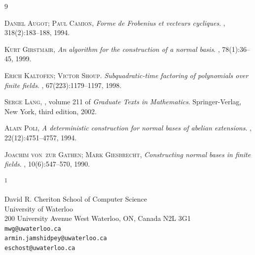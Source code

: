 \documentclass{article}
\newcommand{\ADDRESS}[2]{\noindent
  \textsuperscript{#1}\parbox[t]{0.9\textwidth}{#2} \vspace{6pt}}
\begin{document}



\begin{thebibliography}{9}

\textsc{Daniel Augot; Paul Camion},
\newblock \emph{Forme de {F}robenius et vecteurs cycliques}.
, 318(2):183--188, 1994.

\textsc{Kurt Girstmair},
\newblock \emph{An algorithm for the construction of a normal basis}.
, 78(1):36--45, 1999.

\textsc{Erich Kaltofen; Victor Shoup}.
\newblock \emph{Subquadratic-time factoring of polynomials over finite fields}.
, 67(223):1179--1197, 1998.

\textsc{Serge Lang},
, volume 211 of {\em Graduate Texts in Mathematics}.
\newblock Springer-Verlag, New York, third edition, 2002.

\textsc{Alain Poli},
\newblock \emph{A deterministic construction for normal bases of abelian extensions}.
, 22(12):4751--4757, 1994.

\textsc{Joachim von~zur Gathen; Mark Giesbrecht},
\newblock \emph{Constructing normal bases in finite fields}.
, 10(6):547--570, 1990.

\end{thebibliography}

%
%
%
%

\vspace{1cm}

\ADDRESS{1}{
David R. Cheriton School of Computer Science  \\University of Waterloo \\
200 University Avenue West
Waterloo, ON, Canada  N2L 3G1
 \\
\texttt{mwg@uwaterloo.ca}
\\
\texttt{armin.jamshidpey@uwaterloo.ca}
\\
\texttt{eschost@uwaterloo.ca}

}
\end{document}
